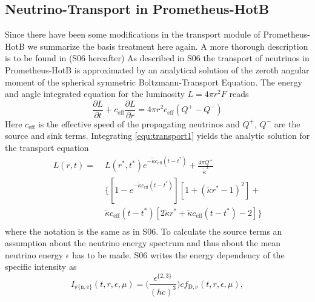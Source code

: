 \documentclass[fleqn,usenatbib]{mnras}
\begin{document}
\newpage
\begin{appendices}

 \section{Neutrino-Transport in Prometheus-HotB}
  \label{Appendix:Neutrino}
   Since there have been some modifications in the transport module of Prometheus-HotB we summarize the basis treatment here again. A more thorough description is to be found in \cite{Scheck2006} (S06 hereafter)
  As described in S06 the transport of neutrinos in Prometheus-HotB is approximated by an analytical solution of the zeroth angular moment of the spherical symmetric Boltzmann-Transport Equation. The energy and angle integrated equation for the luminosity $L=4\pi r^2 F$ reads
 \begin{equation}
  \label{equ:transport1}
  \frac{\partial L}{\partial t} + c_{\mathrm{eff}} \frac{\partial L }{\partial r} = 4 \pi r^2 c_{\mathrm{eff}} (Q^+ - Q^-)
 \end{equation}
 Here $c_{\mathrm{eff}}$ is the effective speed of the propagating neutrinos and $Q^+$, $Q^-$ are the source and sink terms.
 Integrating \ref{equ:transport1} yields the analytic solution for the transport equation
 \begin{equation}
  \begin{split}
    L(r,t) = \; & L(r^*,t^{*}) e^{- \tilde{\kappa} c_{\mathrm{eff}} (t-t^{*}) } + \frac{4\pi Q^{+}}{\tilde{\kappa}^3}\\
    & \Big\{ [ 1 - e^{-\tilde{\kappa} c_{\mathrm{eff}} (t-t^{*} )} ] [ 1 + (\tilde{\kappa}r^{*} -1)^2 ] + \\
    & \tilde{\kappa} c_{\mathrm{eff}} (t - t^{*} ) [ 2 \tilde{\kappa} r^{*} + \tilde{\kappa} c_{\mathrm{eff}} (t-t^{*}) - 2 ] \Big\}\\
 \end{split}
 \end{equation}
 where the notation is the same as in S06.
 To calculate the source terms an assumption about the neutrino energy spectrum and thus about the mean neutrino energy $\epsilon$ has to be made. S06 writes the energy dependency of the specific intensity as
  \begin{equation}
  \label{equ:intensity}
  I_{\mathrm{\nu\{n,e\}}}(t,r,\epsilon,\mu) = \Big(\frac{\epsilon^{\{2,3\}}}{(hc)^3} \Big) c f_{\mathrm{D,\nu}}(t, r, \epsilon, \mu),
 \end{equation}

\end{appendices}
\end{document}
